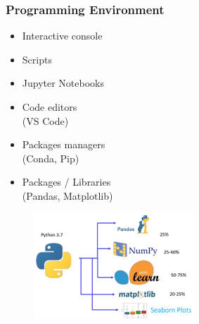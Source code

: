 \begin{frame}\frametitle{Programming Environment}

   \begin{minipage}{0.4\linewidth}
      \begin{itemize}
         \item Interactive console   
         \item Scripts
         \item Jupyter Notebooks
         \item Code editors\\(VS Code)
         \item Packages managers\\(Conda, Pip)
         \item Packages / Libraries\\(Pandas, Matplotlib)
      \end{itemize}
   \end{minipage}
   \begin{minipage}{0.58\linewidth}
      \begin{figure}[H]
         \includegraphics[width=6cm]{../images/illustrations/packages.png}
      \end{figure}
   \end{minipage}
\end{frame}


